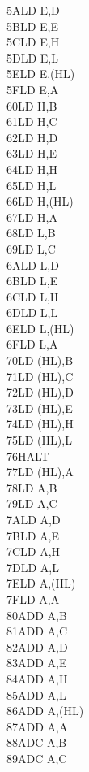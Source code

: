 \begin{multicols}{3}
{\begin{tabbing}
	5A\>LD E,D\\
	5B\>LD E,E\\
	5C\>LD E,H\\
	5D\>LD E,L\\
	5E\>LD E,(HL)\\
	5F\>LD E,A\\
	60\>LD H,B\\
	61\>LD H,C\\
	62\>LD H,D\\
	63\>LD H,E\\
	64\>LD H,H\\
	65\>LD H,L\\
	66\>LD H,(HL)\\
	67\>LD H,A\\
	68\>LD L,B\\
	69\>LD L,C\\
	6A\>LD L,D\\
	6B\>LD L,E\\
	6C\>LD L,H\\
	6D\>LD L,L\\
	6E\>LD L,(HL)\\
	6F\>LD L,A\\
	70\>LD (HL),B\\
	71\>LD (HL),C\\
	72\>LD (HL),D\\
	73\>LD (HL),E\\
	74\>LD (HL),H\\
	75\>LD (HL),L\\
	76\>HALT\\
	77\>LD (HL),A\\
	78\>LD A,B\\
	79\>LD A,C\\
	7A\>LD A,D\\
	7B\>LD A,E\\
	7C\>LD A,H\\
	7D\>LD A,L\\
	7E\>LD A,(HL)\\
	7F\>LD A,A\\
	80\>ADD A,B\\
	81\>ADD A,C\\
	82\>ADD A,D\\
	83\>ADD A,E\\
	84\>ADD A,H\\
	85\>ADD A,L\\
	86\>ADD A,(HL)\\
	87\>ADD A,A\\
	88\>ADC A,B\\
	89\>ADC A,C\\

\end{tabbing}}
\end{multicols}
